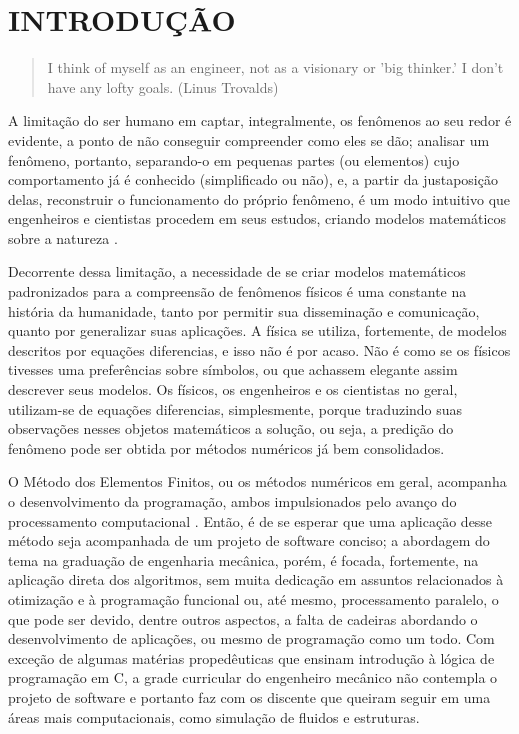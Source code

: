 

\chapter{INTRODUÇÃO}

\begin{quote}
    I think of myself as an engineer, not as a visionary or 'big thinker.' I don't have any lofty goals.
    (Linus Trovalds)  
\end{quote}

A limitação do ser humano em captar, integralmente, os fenômenos ao seu redor é evidente, a ponto de não conseguir compreender como eles se dão; analisar um fenômeno, portanto, separando-o em pequenas partes (ou elementos) cujo comportamento já é conhecido (simplificado ou não), e, a partir da justaposição delas, reconstruir o funcionamento do próprio fenômeno, é um modo intuitivo que engenheiros e cientistas procedem em seus estudos, criando modelos matemáticos sobre a natureza \cite[p. 2]{Zin}.

Decorrente dessa limitação, a necessidade de se criar modelos matemáticos padronizados para a compreensão de fenômenos físicos é uma constante na história da humanidade, tanto por permitir sua disseminação e comunicação, quanto por generalizar suas aplicações. A física se utiliza, fortemente, de modelos descritos por equações diferencias, e isso não é por acaso. Não é como se os físicos tivesses uma preferências sobre símbolos, ou que achassem elegante assim descrever seus modelos. Os físicos, os engenheiros e os cientistas no geral, utilizam-se de equações diferencias, simplesmente, porque traduzindo suas observações nesses objetos matemáticos a solução, ou seja, a predição do fenômeno pode ser obtida por métodos numéricos já bem consolidados.


O Método dos Elementos Finitos, ou os métodos numéricos em geral, acompanha o desenvolvimento da programação, ambos impulsionados pelo avanço do processamento computacional \cite{Onate}. Então, é de se esperar que uma aplicação desse método seja acompanhada de um projeto de software conciso; a abordagem do tema na graduação de engenharia mecânica, porém, é focada, fortemente, na aplicação direta dos algoritmos, sem muita dedicação em assuntos relacionados à otimização e à programação funcional ou, até mesmo, processamento paralelo, o que pode ser devido, dentre outros aspectos, a falta de cadeiras abordando o desenvolvimento de aplicações, ou mesmo de programação como um todo. Com exceção de algumas matérias propedêuticas que ensinam introdução à lógica de programação em C, a grade curricular do engenheiro mecânico não contempla o projeto de software e portanto faz com os discente que queiram seguir em uma áreas mais computacionais, como simulação de fluidos e estruturas.

